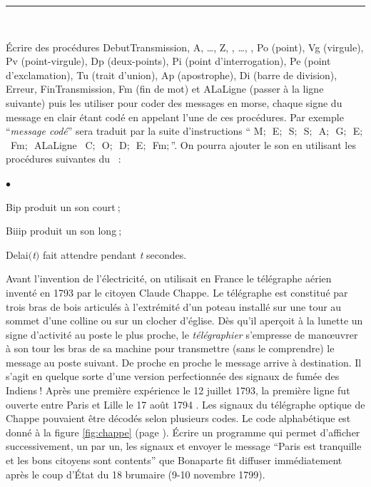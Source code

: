 \noindent \rule{137mm}{0.1mm} %
\begin{exercices}{\ \\
\vspace{-\baselineskip}

\tiret  Écrire des procédures {\idt DebutTransmission}, {\idt A}, \ldots, {\idt Z}, {},
\ldots, {}, {\idt Po} (point), {\idt Vg} (virgule),
 {\idt Pv} (point-virgule), {\idt Dp} (deux-points), {\idt Pi} (point d'in\-ter\-ro\-ga\-tion),
 {\idt Pe} (point d'exclamation), {\idt Tu} (trait d'union), {\idt Ap} (apostrophe),
  {\idt Di} (barre de division),
 {\idt Erreur}, {\idt FinTransmission}, {\idt Fm} (fin de mot) et
 {\idt ALaLigne} (passer à la ligne suivante) puis les utiliser pour coder
 des messages en morse, chaque signe du message en clair étant codé en appelant l'une
 de ces procédures. Par exemple ``{\em message codé}'' sera traduit par la suite d'instructions
`` {\idt M$;$\ E$;$\ S$;$\ S$;$\ A$;$\ G$;$\ E$;$\ Fm$;$\ ALaLigne
 \ C$;$\ O$;$\ D$;$\ E$;$\ Fm$;$}''. On pourra ajouter le son en utilisant les procédures suivantes
 du \robot~:
 \begin{list}{$\scriptscriptstyle\bullet$}{
}
   \item {\idt Bip} produit un son court$\:$;
   \item {\idt Biiip} produit un son long$\:$;
   \item {\idt Delai$(${\rm\em t}$)$} fait attendre pendant {\em t} secondes.
 \end{list}
 
 \tiret Avant l'invention de l'électricité, on utilisait en France le télégraphe  aérien inventé en
 1793 par le citoyen Claude Chappe. Le télégraphe est constitué par trois bras de bois articulés
 à l'extrémité d'un poteau ins\-tal\-lé sur une tour au sommet d'une colline ou sur un clocher d'église.
 Dès qu'il aperçoit à la lunette un signe d'activité au poste le plus proche, le {\em télégraphier}
 s'empresse de manœuvrer à son tour les bras de sa machine pour transmettre (sans le comprendre)
  le message au poste suivant. De proche en proche le message arrive à destination. Il s'agit en
  quelque sorte d'une version perfectionnée des signaux de fumée des Indiens$\:$! Après une première
  expérience le 12 juillet 1793, la première ligne fut ouverte entre Paris et Lille le 17 août 1794
  \cite{bertho}. Les signaux du télégraphe optique de Chappe pouvaient être décodés
  selon plusieurs codes. Le code alphabétique est donné à la figure \ref{fig:chappe} (page
  \pageref{fig:chappe}). Écrire un programme qui permet d'afficher successivement, un par un, les
  signaux et envoyer le message ``Paris est tranquille et les bons citoyens sont contents''
  que Bonaparte fit diffuser immédiatement après le coup d'État du 18 brumaire (9-10 novembre 
  1799).
  
}
\end{exercices}
